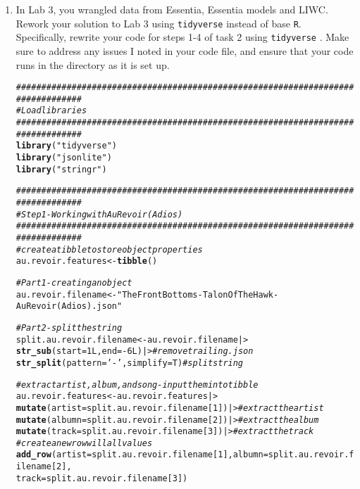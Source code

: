 \documentclass{article}\usepackage[]{graphicx}\usepackage[]{xcolor}
\makeatletter
\newcommand{\hlnum}[1]{\textcolor[rgb]{0.686,0.059,0.569}{#1}}%
\newcommand{\hlsng}[1]{\textcolor[rgb]{0.192,0.494,0.8}{#1}}%
\newcommand{\hlcom}[1]{\textcolor[rgb]{0.678,0.584,0.686}{\textit{#1}}}%
\newcommand{\hlopt}[1]{\textcolor[rgb]{0,0,0}{#1}}%
\newcommand{\hldef}[1]{\textcolor[rgb]{0.345,0.345,0.345}{#1}}%
\newcommand{\hlkwb}[1]{\textcolor[rgb]{0.69,0.353,0.396}{#1}}%
\newcommand{\hlkwc}[1]{\textcolor[rgb]{0.333,0.667,0.333}{#1}}%
\newcommand{\hlkwd}[1]{\textcolor[rgb]{0.737,0.353,0.396}{\textbf{#1}}}%
\newenvironment{kframe}{%
 \def\at@end@of@kframe{}%
 \ifinner\ifhmode%
  \def\at@end@of@kframe{\end{minipage}}%
  \begin{minipage}{\columnwidth}%
 \fi\fi%
 \def\FrameCommand##1{\hskip\@totalleftmargin \hskip-\fboxsep
 \colorbox{shadecolor}{##1}\hskip-\fboxsep
     \hskip-\linewidth \hskip-\@totalleftmargin \hskip\columnwidth}%
 \MakeFramed {\advance\hsize-\width
   \@totalleftmargin\z@ \linewidth\hsize
   \@setminipage}}%
 {\par\unskip\endMakeFramed%
 \at@end@of@kframe}
\newenvironment{knitrout}{}{} %
\makeatother
\begin{document}
\begin{enumerate}
\item In Lab 3, you wrangled data from Essentia, Essentia models and LIWC. Rework your 
solution to Lab 3 using \texttt{tidyverse} \citep{tidyverse} instead of base \texttt{R}.
Specifically, rewrite your code for steps 1-4 of task 2 using \texttt{tidyverse} \citep{tidyverse}. 
Make sure to address any issues I noted in your code file, and ensure that your code 
runs in the directory as it is set up.
\begin{knitrout}\scriptsize
{}\color{fgcolor}\begin{kframe}
\begin{alltt}
\hlcom{################################################################################}
\hlcom{# Load libraries}
\hlcom{################################################################################}
\hlkwd{library}\hldef{(}\hlsng{"tidyverse"}\hldef{)}
\hlkwd{library}\hldef{(}\hlsng{"jsonlite"}\hldef{)}
\hlkwd{library}\hldef{(}\hlsng{"stringr"}\hldef{)}

\hlcom{################################################################################}
\hlcom{# Step 1 - Working with Au Revoir (Adios)}
\hlcom{################################################################################}
\hlcom{#create a tibble to store object properties}
\hldef{au.revoir.features} \hlkwb{<-} \hlkwd{tibble}\hldef{()}

\hlcom{#Part1 - creating an object}
\hldef{au.revoir.filename} \hlkwb{<-} \hlsng{"The Front Bottoms-Talon Of The Hawk-Au Revoir (Adios).json"}

\hlcom{#Part2 - split the string}
\hldef{split.au.revoir.filename} \hlkwb{<-} \hldef{au.revoir.filename |>}
  \hlkwd{str_sub}\hldef{(}\hlkwc{start} \hldef{=} \hlnum{1L}\hldef{,} \hlkwc{end} \hldef{=} \hlopt{-}\hlnum{6L}\hldef{)|>} \hlcom{#remove trailing .json}
  \hlkwd{str_split}\hldef{(}\hlkwc{pattern} \hldef{=} \hlsng{'-'}\hldef{,} \hlkwc{simplify} \hldef{=T)} \hlcom{#split string}

\hlcom{#extract artist, album, and song - input them into tibble}
\hldef{au.revoir.features} \hlkwb{<-} \hldef{au.revoir.features|>}
  \hlkwd{mutate}\hldef{(}\hlkwc{artist} \hldef{= split.au.revoir.filename[}\hlnum{1}\hldef{]) |>} \hlcom{#extract the artist}
  \hlkwd{mutate}\hldef{(}\hlkwc{albumn} \hldef{= split.au.revoir.filename[}\hlnum{2}\hldef{]) |>} \hlcom{#extract the album}
  \hlkwd{mutate}\hldef{(}\hlkwc{track} \hldef{= split.au.revoir.filename[}\hlnum{3}\hldef{]) |>} \hlcom{#extract the track}
  \hlcom{#create a new row will all values}
  \hlkwd{add_row}\hldef{(}\hlkwc{artist} \hldef{= split.au.revoir.filename[}\hlnum{1}\hldef{],} \hlkwc{albumn} \hldef{= split.au.revoir.filename[}\hlnum{2}\hldef{],}
          \hlkwc{track} \hldef{= split.au.revoir.filename[}\hlnum{3}\hldef{])}



\end{alltt}
\end{kframe}
\end{knitrout}
\end{enumerate}
\end{document}
